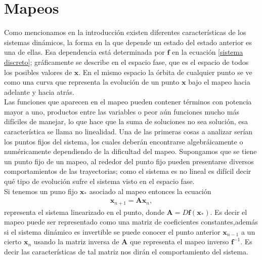 \section{Mapeos}
Como mencionamos en la introducción existen diferentes características de los sistemas dinámicos, la forma en la que depende un estado del estado anterior es una de ellas. Esa dependencia está determinada por $\mathbf{f}$ en la ecuación \ref{sistema discreto}; gráficamente se describe en el espacio fase, que es el espacio de todos los posibles valores de $\pmb x$. En el mismo espacio la órbita de cualquier punto se ve como una curva que representa la evolución de un punto $\pmb x$ bajo el mapeo hacia adelante y hacia atrás. \\

Las funciones que aparecen en el mapeo pueden contener términos con potencia mayor a uno, productos entre las variables o peor aún funciones mucho más difíciles de manejar, lo que hace que la suma de soluciones no sea solución, esa característica se llama no linealidad. Una de las primeras cosas a analizar serían los puntos fijos del sistema, los cuales deberán encontrarse algebráicamente o numéricamente dependiendo de la dificultad del mapeo. Supongamos que se tiene un punto fijo de un mapeo, al rededor del punto fijo pueden presentarse diversos comportamientos de las trayectorias; como el sistema es no lineal es difícil decir qué tipo de evolución sufre el sistema visto en el espacio fase.\\


Si tenemos un puno fijo $\mathbf{x}_{*}$ asociado al mapeo entonces la ecuación
\begin{eqnarray}
\mathbf{x}_{n+1} =\mathbf{A}\mathbf{x}_{n},
\end{eqnarray}
representa el sistema linearizado en el punto, donde $\mathbf{A}=D\mathbf{f}(\mathbf{x}_{*})$. Es decir el mapeo puede ser representado como una matriz de coeficientes constantes,además si el sistema dinámico es invertible se puede conocer el punto anterior $\mathbf{x}_{n-1}$ a un cierto $\mathbf{x}_{n}$ usando la matriz inversa de $\mathbf{A}$ que representa el mapeo inverso $\mathbf{f}^{-1}$. Es decir las características de tal matriz nos dirán el comportamiento del sistema. \\

